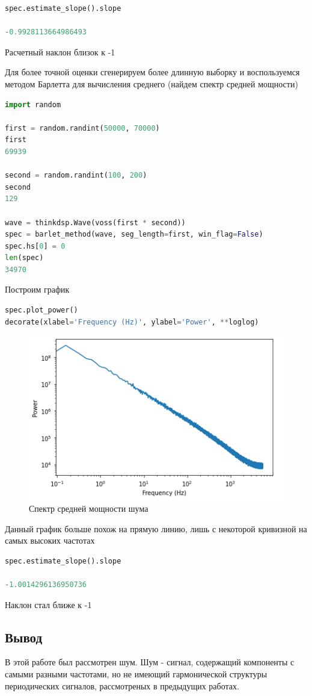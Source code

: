 \begin{lstlisting}[language=Python]
spec.estimate_slope().slope

-0.9928113664986493
\end{lstlisting}

Расчетный наклон близок к -1

Для более точной оценки сгенерируем более длинную выборку и воспользуемся методом Барлетта для вычисления среднего (найдем спектр средней мощности)

\begin{lstlisting}[language=Python]
import random

first = random.randint(50000, 70000)
first
69939

second = random.randint(100, 200)
second
129

wave = thinkdsp.Wave(voss(first * second))
spec = barlet_method(wave, seg_length=first, win_flag=False)
spec.hs[0] = 0
len(spec)
34970
\end{lstlisting}

Построим график

\begin{lstlisting}[language=Python]
spec.plot_power()
decorate(xlabel='Frequency (Hz)', ylabel='Power', **loglog)
\end{lstlisting}

\begin{figure}[H]
	\begin{center}
		\includegraphics[scale=1]{fig/lab04/lab04_14.png}
		\caption{Спектр средней мощности шума}
	\end{center}
\end{figure}

Данный график больше похож на прямую линию, лишь с некоторой кривизной на самых высоких частотах


\begin{lstlisting}[language=Python]
spec.estimate_slope().slope

-1.0014296136950736
\end{lstlisting}

Наклон стал ближе к -1


\subsection{Вывод}

В этой работе был рассмотрен шум. Шум - сигнал, содержащий компоненты с самыми разными частотами, но не имеющий гармонической структуры периодических сигналов, рассмотреных в предыдущих работах.